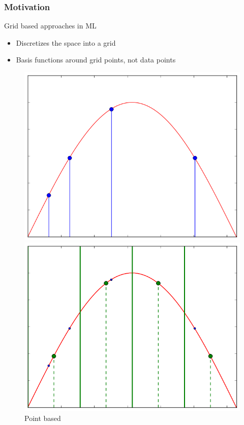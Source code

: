 \begin{frame}
  \frametitle{Motivation}
  \topline
  \vspace{-10px}
  \begin{block}{Grid based approaches in ML}
    \begin{itemize}
      \item Discretizes the space into a grid
      \item Basis functions around grid points, not data points
    \end{itemize}

    \begin{figure}[!htb]
      \includegraphics[width=\linewidth]{images/pointbase.png}
      \vspace{-12px}
      \caption{Point based}
      \endminipage
      \hspace{0.025\textwidth}
      \includegraphics[width=\linewidth]{images/gridbase.png}

\end{figure}
\end{block}
\end{frame}
